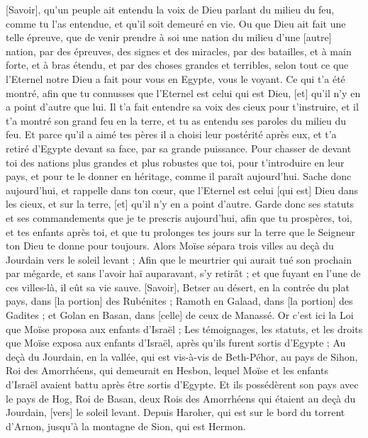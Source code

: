 \begin{multicols}{2}
[Savoir], qu'un peuple ait entendu la voix de Dieu parlant du milieu du feu, comme tu l'as entendue, et qu'il soit demeuré en vie.
Ou que Dieu ait fait une telle épreuve, que de venir prendre à soi une nation du milieu d'une [autre] nation, par des épreuves, des signes et des miracles, par des batailles, et à main forte, et à bras étendu, et par des choses grandes et terribles, selon tout ce que l'Eternel notre Dieu a fait pour vous en Egypte, vous le voyant.
Ce qui t'a été montré, afin que tu connusses que l'Eternel est celui qui est Dieu, [et] qu'il n'y en a point d'autre que lui.
Il t'a fait entendre sa voix des cieux pour t'instruire, et il t'a montré son grand feu en la terre, et tu as entendu ses paroles du milieu du feu.
Et parce qu'il a aimé tes pères il a choisi leur postérité après eux, et t'a retiré d'Egypte devant sa face, par sa grande puissance.
Pour chasser de devant toi des nations plus grandes et plus robustes que toi, pour t'introduire en leur pays, et pour te le donner en héritage, comme il paraît aujourd'hui.
Sache donc aujourd'hui, et rappelle dans ton cœur, que l'Eternel est celui [qui est] Dieu dans les cieux, et sur la terre, [et] qu'il n'y en a point d'autre.
Garde donc ses statuts et ses commandements que je te prescris aujourd'hui, afin que tu prospères, toi, et tes enfants après toi, et que tu prolonges tes jours sur la terre que le Seigneur ton Dieu te donne pour toujours.
Alors Moïse sépara trois villes au deçà du Jourdain vers le soleil levant ;
Afin que le meurtrier qui aurait tué son prochain par mégarde, et sans l'avoir haï auparavant, s'y retirât ; et que fuyant en l'une de ces villes-là, il eût sa vie sauve.
[Savoir], Betser au désert, en la contrée du plat pays, dans [la portion] des Rubénites ; Ramoth en Galaad, dans [la portion] des Gadites ; et Golan en Basan, dans [celle] de ceux de Manassé.
Or c'est ici la Loi que Moïse proposa aux enfants d'Israël ;
Les témoignages, les statuts, et les droits que Moïse exposa aux enfants d'Israël, après qu'ils furent sortis d'Egypte ;
Au deçà du Jourdain, en la vallée, qui est vis-à-vis de Beth-Péhor, au pays de Sihon, Roi des Amorrhéens, qui demeurait en Hesbon, lequel Moïse et les enfants d'Israël avaient battu après être sortis d'Egypte.
Et ils possédèrent son pays avec le pays de Hog, Roi de Basan, deux Rois des Amorrhéens qui étaient au deçà du Jourdain, [vers] le soleil levant.
Depuis Haroher, qui est sur le bord du torrent d'Arnon, jusqu'à la montagne de Sion, qui est Hermon.

\end{multicols}
